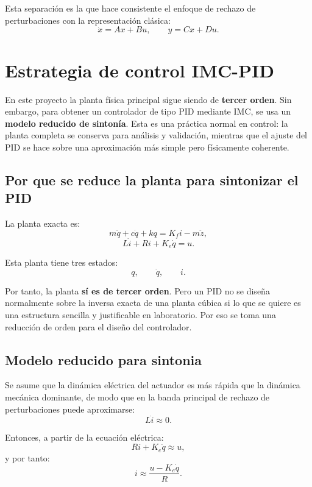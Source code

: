 \documentclass[11pt]{article}
\begin{document}
Esta separaci\'on es la que hace consistente el enfoque de rechazo de perturbaciones con la representaci\'on cl\'asica:
\[
\dot x=Ax+Bu,\qquad y=Cx+Du.
\]

\section{Estrategia de control IMC-PID}

En este proyecto la planta f\'isica principal sigue siendo de \textbf{tercer orden}. Sin embargo, para obtener un controlador de tipo PID mediante IMC, se usa un \textbf{modelo reducido de sinton\'ia}. Esta es una pr\'actica normal en control: la planta completa se conserva para an\'alisis y validaci\'on, mientras que el ajuste del PID se hace sobre una aproximaci\'on m\'as simple pero f\'isicamente coherente.

\subsection{Por que se reduce la planta para sintonizar el PID}

La planta exacta es:
\begin{equation}
m\ddot q + c\dot q + kq = K_f i - m\ddot z,
\end{equation}
\begin{equation}
L\dot i + Ri + K_e\dot q = u.
\end{equation}

Esta planta tiene tres estados:
\[
q,\qquad \dot q,\qquad i.
\]

Por tanto, la planta \textbf{s\'i es de tercer orden}. Pero un PID no se dise\~na normalmente sobre la inversa exacta de una planta c\'ubica si lo que se quiere es una estructura sencilla y justificable en laboratorio. Por eso se toma una reducci\'on de orden para el dise\~no del controlador.

\subsection{Modelo reducido para sintonia}

Se asume que la din\'amica el\'ectrica del actuador es m\'as r\'apida que la din\'amica mec\'anica dominante, de modo que en la banda principal de rechazo de perturbaciones puede aproximarse:
\begin{equation}
L\dot i \approx 0.
\label{eq:current_fast}
\end{equation}

Entonces, a partir de la ecuaci\'on el\'ectrica:
\begin{equation}
Ri + K_e\dot q \approx u,
\end{equation}
y por tanto:
\begin{equation}
i \approx \frac{u-K_e\dot q}{R}.
\label{eq:i_approx}
\end{equation}
\end{document}
